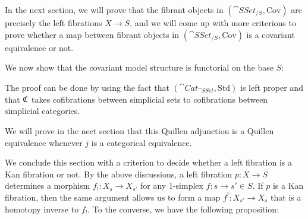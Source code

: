 In the next section, we will prove that the fibrant objects in $(\cat{SSet}_{/S},\text{Cov})$ are precisely the left fibrations
$X\to S$, and we will come up with more criterions to prove whether a map between fibrant objects in $(\cat{SSet}_{/S},\text{Cov})$
is a covariant equivalence or not.

We now show that the covariant model structure is functorial on the base $S$:


The proof can be done by using the fact that $(\cat{Cat}_{\cat{SSet}},\text{Std})$ is left proper and that
$\mathfrak{C}$ takes cofibrations between simplicial sets to cofibrations between simplicial categories.

We will prove in the nect section that this Quillen adjunction is a Quillen equivalence whenever $j$ is a categorical equivalence.


We conclude this section with a criterion to decide whether a left fibration is a Kan fibration or not. By the above discussions,
a left fibration $p:X\to S$ determines a morphism $f_!:X_s\to X_{s'}$ for any $1$-simplex $f:s\to s'\in S$. If $p$ is a Kan fibration,
then the same argument allows us to form a map $f^!:X_{s'}\to X_{s}$ that is a homotopy inverse to $f_!$. To the converse, we have 
the following proposition:

